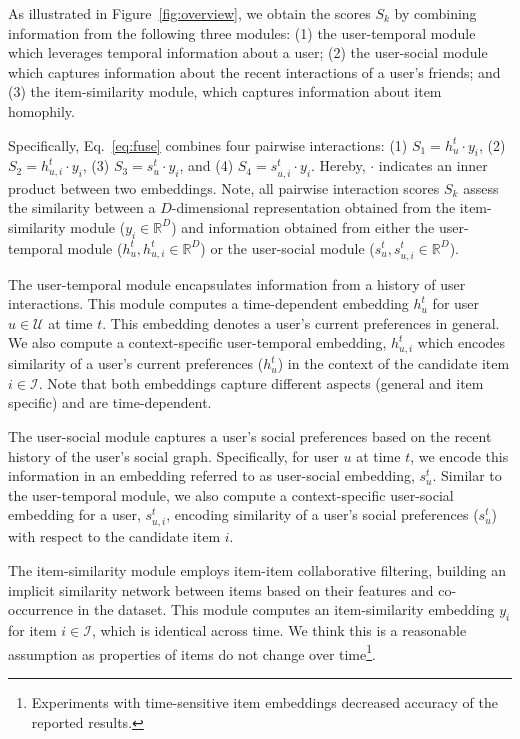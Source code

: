 As illustrated in Figure~\ref{fig:overview}, we obtain the  scores $S_k$ by combining information from the following three modules:
(1) the user-temporal module which leverages temporal information about a user;
(2) the user-social module which captures information about the recent interactions of a user's friends; and
(3) the item-similarity module, which captures information about item homophily.

Specifically, Eq.~\eqref{eq:fuse} combines four  pairwise interactions:
(1) $S_1 = h_u^{t} \cdot {y}_i$,
(2) $S_2 = h_{u, i}^{t} \cdot {y}_i$,
(3) $S_3 = s_u^{t} \cdot {y}_i$, and
(4) $S_4 = s_{u, i}^{t} \cdot {y}_i$.
Hereby, $\cdot$ indicates an inner product between two embeddings.
Note, all pairwise interaction scores $S_k$ assess the similarity between a $D$-dimensional representation obtained from the item-similarity module (${y}_i\in\mathbb{R}^D$) and information obtained from either the user-temporal module ($h_u^{t} , h_{u,i}^{t}\in\mathbb{R}^D$) or the user-social module ($s_u^{t} , s_{u,i}^{t}\in\mathbb{R}^D$).

The user-temporal module encapsulates information from a history of user interactions. This module computes a time-dependent embedding $h_u^t$ for user $u \in {\mathcal U}$ at time $t$. This embedding denotes a user's current preferences in general. We also compute a context-specific user-temporal  embedding, $h_{u,i}^t$ which encodes similarity of a user's current preferences ($h_u^t$) in the context of the candidate item $i \in {\mathcal I}$. Note that both embeddings capture different aspects (general and item specific) and are time-dependent.

The user-social module captures a user's social preferences based on the recent history of the user's social graph. Specifically, for user $u$ at time $t$, we encode this information in an embedding referred to as user-social embedding, $s_u^t$. Similar to the user-temporal module, we also compute a context-specific user-social embedding for a user, $s_{u,i}^t$, encoding similarity of a user's social preferences ($s_u^t$) with respect to the candidate item $i$.


The item-similarity module employs item-item collaborative filtering, building an implicit similarity network between items based on their features and co-occurrence in the dataset.
This module computes an item-similarity embedding ${y}_i$ for item $i \in {\mathcal I}$, which is identical across time. We think this is a reasonable assumption as properties of items do not change over time\footnote{Experiments with time-sensitive item embeddings decreased accuracy of the reported results.}.

